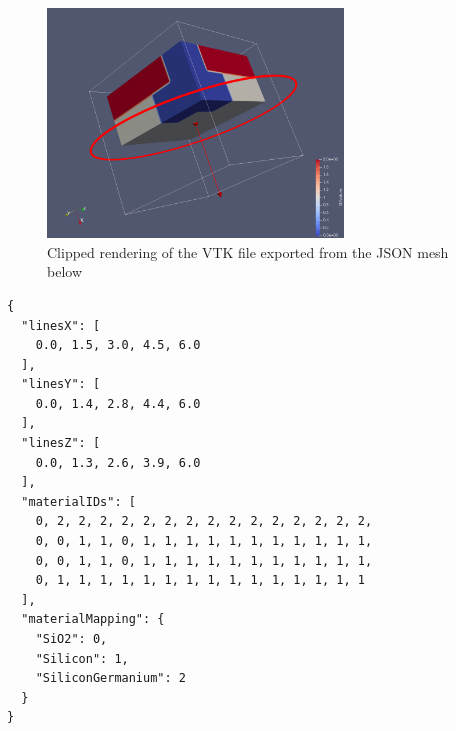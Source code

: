\begin{figure}[!htb]
  \centering
  \includegraphics[width=0.7\textwidth]{images/vtk-export-cut.png}
  \caption{\label{fig-vtk-export-cut} Clipped rendering of the VTK file exported from the JSON mesh below}
\end{figure}

\begin{lstlisting}
{
  "linesX": [
    0.0, 1.5, 3.0, 4.5, 6.0
  ],
  "linesY": [
    0.0, 1.4, 2.8, 4.4, 6.0
  ],
  "linesZ": [
    0.0, 1.3, 2.6, 3.9, 6.0
  ],
  "materialIDs": [
    0, 2, 2, 2, 2, 2, 2, 2, 2, 2, 2, 2, 2, 2, 2, 2,
    0, 0, 1, 1, 0, 1, 1, 1, 1, 1, 1, 1, 1, 1, 1, 1,
    0, 0, 1, 1, 0, 1, 1, 1, 1, 1, 1, 1, 1, 1, 1, 1,
    0, 1, 1, 1, 1, 1, 1, 1, 1, 1, 1, 1, 1, 1, 1, 1
  ],
  "materialMapping": {
    "SiO2": 0,
    "Silicon": 1,
    "SiliconGermanium": 2
  }
}
\end{lstlisting}
